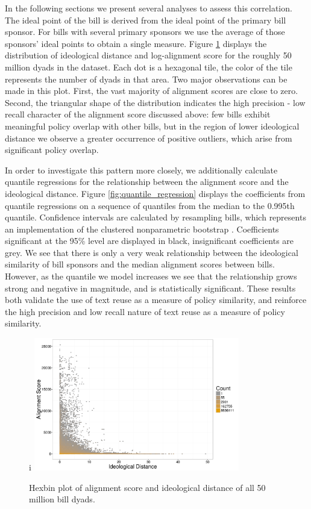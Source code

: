 \documentclass[12pt]{article} %
\begin{document}
In the following sections we present several analyses to assess this correlation. The ideal point of the bill is derived from the ideal point of the primary bill sponsor. For bills with several primary sponsors we use the average of those sponsors' ideal points to obtain a single measure. Figure \ref{fig:ideology_plot} displays the distribution of ideological distance and log-alignment score for the roughly 50 million dyads in the dataset. Each dot is a hexagonal tile, the color of the tile represents the number of dyads in that area. Two major observations can be made in this plot. First, the vast majority of alignment scores are close to zero. Second, the triangular shape of the distribution indicates the high precision - low recall character of the alignment score discussed above: few bills exhibit meaningful policy overlap with other bills, but in the region of lower ideological distance we observe a greater occurrence of positive outliers, which arise from significant policy overlap. 

In order to investigate this pattern more closely, we additionally calculate
quantile regressions for the relationship between the alignment score and the
ideological distance. Figure \ref{fig:quantile_regression} displays the
coefficients from quantile regressions on a sequence of quantiles from the
median to the 0.995th quantile. Confidence intervals are calculated by resampling bills, which represents an implementation of the clustered nonparametric bootstrap \citet[see e.g.][]{harden2011bootstrap}. Coefficients significant at the 95\% level are displayed in black, insignificant coefficients are grey. We see that there is only a very weak relationship between the ideological similarity of bill sponsors and the median alignment scores between bills. However, as the quantile we model increases we see that the relationship grows strong and negative in magnitude, and is statistically significant. These results both validate the use of text reuse as a measure of policy similarity, and reinforce the high precision and low recall nature of text reuse as a measure of policy similarity.


\begin{figure}[ht!]i
    \centering
    \includegraphics[width=0.8\textwidth]{figures/ideology_plot.png}
    \caption{Hexbin plot of alignment score and ideological distance of all 50 million bill dyads.}
    \label{fig:ideology_plot}
\end{figure}
\end{document}
